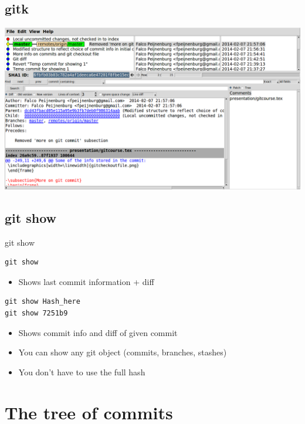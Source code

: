 \documentclass[10pt,a4paper]{beamer}
\begin{document}
\subsection{gitk}
\begin{frame}
\includegraphics[width=\linewidth]{gitk.png}
\end{frame}

\subsection{git show}
\begin{frame}[fragile]{git show}
\begin{verbatim}
git show
\end{verbatim}
\begin{itemize}
\item Shows last commit information + diff
\end{itemize}

\begin{verbatim}
git show Hash_here
git show 7251b9
\end{verbatim}
\begin{itemize}
\item Shows commit info and diff of given commit
\item You can show any git object (commits, branches, stashes)
\item You don't have to use the full hash
\end{itemize}
\end{frame}


\section{The tree of commits}
\end{document}
